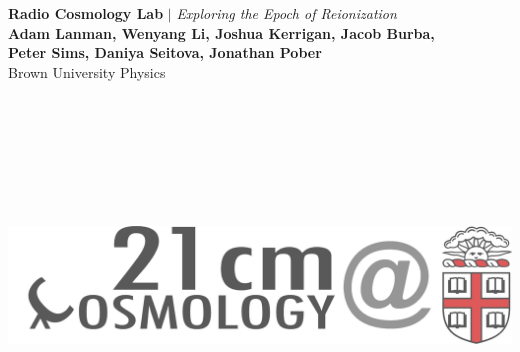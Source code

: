 \documentclass[a0,landscape]{a0poster}
\begin{document}


\begin{minipage}[b]{0.45\textwidth}
\veryHuge \color{Brown} \textbf{Radio Cosmology Lab} \color{Black}\textbf{$|$} \color{Black}\LARGE\textit{Exploring the Epoch of Reionization}\\
\textbf{Adam Lanman, Wenyang Li, Joshua Kerrigan, Jacob Burba, \\Peter Sims, Daniya Seitova, Jonathan Pober}\\ %
\huge Brown University Physics\\ %
\end{minipage}
\hfill
\begin{minipage}[b]{0.45\textwidth}
\includegraphics[width=50cm, height=10cm]{radiologo_update.png} %
\end{minipage}
\vspace*{10pt}

\end{document}
